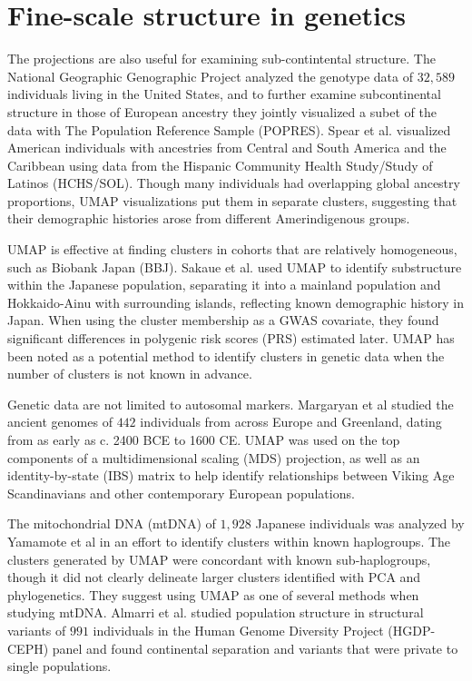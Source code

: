 \documentclass[12pt]{article}
\begin{document}
\section*{Fine-scale structure in genetics}
The projections are also useful for examining sub-contintental structure. The National Geographic Genographic Project analyzed the genotype data of $32,589$ individuals living in the United States\cite{dai_population_2020}, and to further examine subcontinental structure in those of European ancestry they jointly visualized a subet of the data with The Population Reference Sample (POPRES)\cite{nelson2008population}. Spear et al. visualized American individuals with ancestries from Central and South America and the Caribbean using data from the Hispanic Community Health Study/Study of Latinos (HCHS/SOL)\cite{sorlie2010design}. Though many individuals had overlapping global ancestry proportions, UMAP visualizations put them in separate clusters, suggesting that their demographic histories arose from different Amerindigenous groups\cite{spear2020recent}.

UMAP is effective at finding clusters in cohorts that are relatively homogeneous, such as Biobank Japan (BBJ)\cite{nagai2017overview}. Sakaue et al.\cite{sakaue_dimensionality_2020} used UMAP to identify substructure within the Japanese population, separating it into a mainland population and Hokkaido-Ainu with surrounding islands, reflecting known demographic history in Japan. When using the cluster membership as a GWAS covariate, they found significant differences in polygenic risk scores (PRS) estimated later. UMAP has been noted as a potential method to identify clusters in  genetic data when the number of clusters is not known in advance\cite{tonkin-hill_fast_2019}.

Genetic data are not limited to autosomal markers. Margaryan et al\cite{margaryan_population_2019} studied the ancient genomes of $442$ individuals from across Europe and Greenland, dating from as early as c. 2400 BCE to 1600 CE. UMAP was used on the top components of a multidimensional scaling (MDS) projection, as well as an identity-by-state (IBS) matrix to help identify relationships between Viking Age Scandinavians and other contemporary European populations. 

The mitochondrial DNA (mtDNA) of $1,928$ Japanese individuals was analyzed by Yamamote et al in an effort to identify clusters within known haplogroups\cite{yamamoto_genetic_2020}. The clusters generated by UMAP were concordant with known sub-haplogroups, though it did not clearly delineate larger clusters identified with PCA and phylogenetics. They suggest using UMAP as one of several methods when studying mtDNA. Almarri et al.\cite{almarri_population_2020} studied population structure in structural variants of $991$ individuals in the Human Genome Diversity Project (HGDP-CEPH) panel and found continental separation and variants that were private to single populations.
\end{document}
